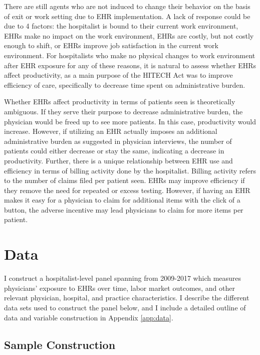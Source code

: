 \documentclass[12pt]{article}
\begin{document}
There are still agents who are not induced to change their behavior on the basis of exit or work setting due to EHR implementation. A lack of response could be due to 4 factors: the hospitalist is bound to their current work environment, EHRs make no impact on the work environment, EHRs are costly, but not costly enough to shift, or EHRs improve job satisfaction in the current work environment. For hospitalists who make no physical changes to work environment after EHR exposure for any of these reasons, it is natural to assess whether EHRs affect productivity, as a main purpose of the HITECH Act was to improve efficiency of care, specifically to decrease time spent on administrative burden. 

Whether EHRs affect productivity in terms of patients seen is theoretically ambiguous. If they serve their purpose to decrease administrative burden, the physician would be freed up to see more patients. In this case, productivity would increase. However, if utilizing an EHR actually imposes an additional administrative burden as suggested in physician interviews, the number of patients could either decrease or stay the same, indicating a decrease in productivity. Further, there is a unique relationship between EHR use and efficiency in terms of billing activity done by the hospitalist. Billing activity refers to the number of claims filed per patient seen. EHRs may improve efficiency if they remove the need for repeated or excess testing. However, if having an EHR makes it easy for a physician to claim for additional items with the click of a button, the adverse incentive may lead physicians to claim for more items per patient.




\section{Data}\label{sec:data}

I construct a hospitalist-level panel spanning from 2009-2017 which measures physicians' exposure to EHRs over time, labor market outcomes, and other relevant physician, hospital, and practice characteristics. I describe the different data sets used to construct the panel below, and I include a detailed outline of data and variable construction in Appendix \ref{app:data}.

\subsection{Sample Construction}
\end{document}
